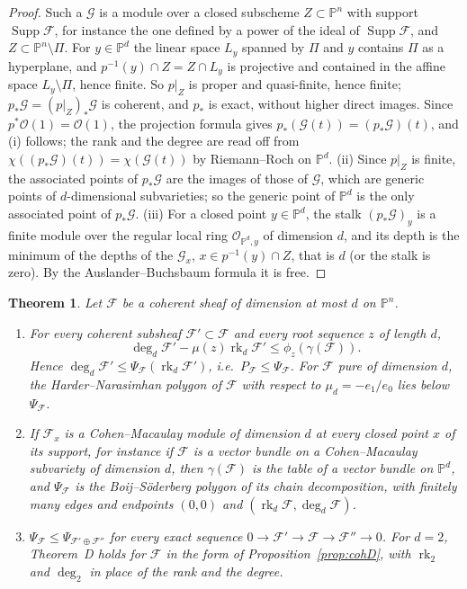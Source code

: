 \documentclass[11pt]{amsart}
\newtheorem{theorem}{Theorem}[section]
\theoremstyle{definition}
\theoremstyle{remark}
\newcommand{\PP}{\mathbb{P}}
\newcommand{\OO}{\mathcal{O}}
\newcommand{\cF}{\mathcal{F}}
\DeclareMathOperator{\rk}{rk}
\begin{document}
\begin{proof}
Such a $\mathcal G$ is a module over a closed subscheme $Z\subset\PP^n$ with support $\operatorname{Supp}\cF$, for instance the one defined by a power of the ideal of $\operatorname{Supp}\cF$, and $Z\subset\PP^n\setminus\Pi$. For $y\in\PP^d$ the linear space $L_y$ spanned by $\Pi$ and $y$ contains $\Pi$ as a hyperplane, and $p^{-1}(y)\cap Z=Z\cap L_y$ is projective and contained in the affine space $L_y\setminus\Pi$, hence finite. So $p|_Z$ is proper and quasi-finite, hence finite; $p_*\mathcal G=(p|_Z)_*\mathcal G$ is coherent, and $p_*$ is exact, without higher direct images. Since $p^*\OO(1)=\OO(1)$, the projection formula gives $p_*(\mathcal G(t))=(p_*\mathcal G)(t)$, and (i) follows; the rank and the degree are read off from $\chi((p_*\mathcal G)(t))=\chi(\mathcal G(t))$ by Riemann--Roch on $\PP^d$. (ii) Since $p|_Z$ is finite, the associated points of $p_*\mathcal G$ are the images of those of $\mathcal G$, which are generic points of $d$-dimensional subvarieties; so the generic point of $\PP^d$ is the only associated point of $p_*\mathcal G$. (iii) For a closed point $y\in\PP^d$, the stalk $(p_*\mathcal G)_y$ is a finite module over the regular local ring $\OO_{\PP^d,y}$ of dimension $d$, and its depth is the minimum of the depths of the $\mathcal G_x$, $x\in p^{-1}(y)\cap Z$, that is $d$ (or the stalk is zero). By the Auslander--Buchsbaum formula it is free.
\end{proof}

\begin{theorem}\label{thm:lowerdim}
Let $\cF$ be a coherent sheaf of dimension at most $d$ on $\PP^n$.
\begin{enumerate}[label=\textup{(\alph*)}]
\item For every coherent subsheaf $\cF'\subset\cF$ and every root sequence $z$ of length $d$,
\[
\deg_d\cF'-\mu(z)\rk_d\cF'\le\phi_z(\gamma(\cF)).
\]
Hence $\deg_d\cF'\le\Psi_\cF(\rk_d\cF')$, i.e.\ $P_\cF\le\Psi_\cF$. For $\cF$ pure of dimension $d$, the Harder--Narasimhan polygon of $\cF$ with respect to $\mu_d=-e_1/e_0$ lies below $\Psi_\cF$.
\item If $\cF_x$ is a Cohen--Macaulay module of dimension $d$ at every closed point $x$ of its support, for instance if $\cF$ is a vector bundle on a Cohen--Macaulay subvariety of dimension $d$, then $\gamma(\cF)$ is the table of a vector bundle on $\PP^d$, and $\Psi_\cF$ is the Boij--Söderberg polygon of its chain decomposition, with finitely many edges and endpoints $(0,0)$ and $(\rk_d\cF,\deg_d\cF)$.
\item $\Psi_\cF\le\Psi_{\cF'\oplus\cF''}$ for every exact sequence $0\to\cF'\to\cF\to\cF''\to0$. For $d=2$, Theorem~D holds for $\cF$ in the form of Proposition~\ref{prop:cohD}, with $\rk_2$ and $\deg_2$ in place of the rank and the degree.
\end{enumerate}
\end{theorem}
\end{document}

